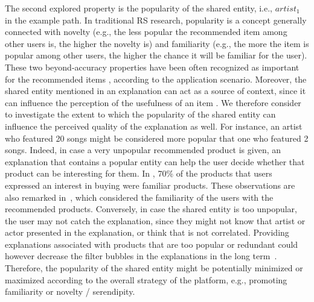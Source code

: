 \documentclass[sigconf]{acmart}
\begin{document}
\vspace{1mm}  
The second explored property is the popularity of the shared entity, i.e., $artist_1$ in the example path. In traditional RS research, popularity is a concept generally connected with novelty (e.g., the less popular the recommended item among other users is, the higher the novelty is) and familiarity (e.g., the more the item is popular among other users, the higher the chance it will be familiar for the user). These two beyond-accuracy properties have been often recognized as important for the recommended items \cite{DBLP:journals/tiis/KaminskasB17}, according to the application scenario. {\color{black} Moreover, the shared entity mentioned in an explanation can act as a source of context, since it can influence the perception of the usefulness of an item \cite{10.1145/2533670.2533675}}. We therefore consider to investigate the extent to which the popularity of the shared entity can influence the perceived quality of the explanation as well. 
For instance, an artist who featured 20 songs might be considered more popular that one who featured 2 songs. 
Indeed, in case a very unpopular recommended product is given, an explanation that contains a popular entity can help the user decide whether that product can be interesting for them. 
In \cite{SwearingenS02}, 70\% of the products that users expressed an interest in buying were familiar products.
These observations are also remarked in~\cite{PuCH12}, which considered the familiarity of the users with the recommended products. 
Conversely, in case the shared entity is too unpopular, the user may not catch the explanation, since they might not know that artist or actor presented in the explanation, or think that is not correlated. 
Providing explanations associated with products that are too popular or redundant could however decrease the filter bubbles in the explanations in the long term~\cite{GedikliJG14}.
Therefore, the popularity of the shared entity might be potentially minimized or maximized according to the overall strategy of the platform, e.g., promoting familiarity or novelty / serendipity. 
\end{document}
